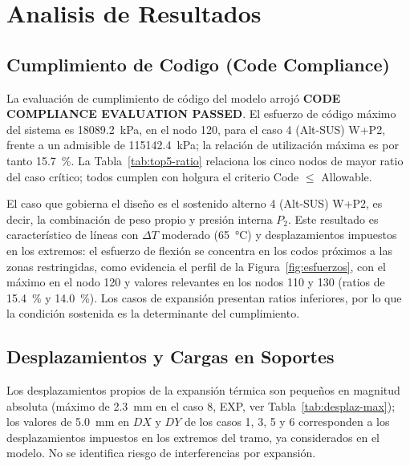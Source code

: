 \section{Analisis de Resultados}
\label{sec:analisis}

\subsection{Cumplimiento de Codigo (Code Compliance)}

La evaluaci\'{o}n de cumplimiento de c\'{o}digo del modelo arroj\'{o}
\textbf{CODE COMPLIANCE EVALUATION PASSED}. El esfuerzo de c\'{o}digo
m\'{a}ximo del sistema es \num{18089.2}~\si{kPa}, en el nodo 120, para el caso
4 (Alt-SUS) W+P2, frente a un admisible de \num{115142.4}~\si{kPa}; la
relaci\'{o}n de utilizaci\'{o}n m\'{a}xima es por tanto 15.7~\%. La
Tabla~\ref{tab:top5-ratio} relaciona los cinco nodos de mayor ratio del caso
cr\'{i}tico; todos cumplen con holgura el criterio Code $\leq$ Allowable.



El caso que gobierna el dise\~{n}o es el sostenido alterno 4 (Alt-SUS) W+P2,
es decir, la combinaci\'{o}n de peso propio y presi\'{o}n interna $P_2$. Este
resultado es caracter\'{i}stico de l\'{i}neas con $\Delta T$ moderado
(65~\si{\celsius}) y desplazamientos impuestos en los extremos: el esfuerzo de
flexi\'{o}n se concentra en los codos pr\'{o}ximos a las zonas restringidas,
como evidencia el perfil de la Figura~\ref{fig:esfuerzos}, con el m\'{a}ximo en
el nodo 120 y valores relevantes en los nodos 110 y 130 (ratios de 15.4~\% y
14.0~\%). Los casos de expansi\'{o}n presentan ratios inferiores, por lo que la
condici\'{o}n sostenida es la determinante del cumplimiento.

\subsection{Desplazamientos y Cargas en Soportes}

Los desplazamientos propios de la expansi\'{o}n t\'{e}rmica son peque\~{n}os en
magnitud absoluta (m\'{a}ximo de 2.3~\si{mm} en el caso 8, EXP, ver
Tabla~\ref{tab:desplaz-max}); los valores de 5.0~\si{mm} en $DX$ y $DY$ de los
casos 1, 3, 5 y 6 corresponden a los desplazamientos impuestos en los extremos del
tramo, ya considerados en el modelo. No se identifica riesgo de interferencias
por expansi\'{o}n.

